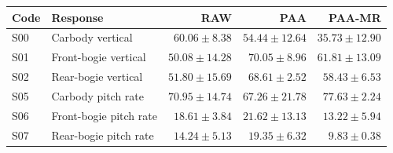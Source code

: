 \begin{tabular}{llrrr}
\toprule
Code & Response & RAW & PAA & PAA-MR \\
\midrule
S00 & Carbody vertical & $60.06 \pm 8.38$ & $54.44 \pm 12.64$ & $35.73 \pm 12.90$ \\
S01 & Front-bogie vertical & $50.08 \pm 14.28$ & $70.05 \pm 8.96$ & $61.81 \pm 13.09$ \\
S02 & Rear-bogie vertical & $51.80 \pm 15.69$ & $68.61 \pm 2.52$ & $58.43 \pm 6.53$ \\
S05 & Carbody pitch rate & $70.95 \pm 14.74$ & $67.26 \pm 21.78$ & $77.63 \pm 2.24$ \\
S06 & Front-bogie pitch rate & $18.61 \pm 3.84$ & $21.62 \pm 13.13$ & $13.22 \pm 5.94$ \\
S07 & Rear-bogie pitch rate & $14.24 \pm 5.13$ & $19.35 \pm 6.32$ & $9.83 \pm 0.38$ \\
\bottomrule
\end{tabular}
